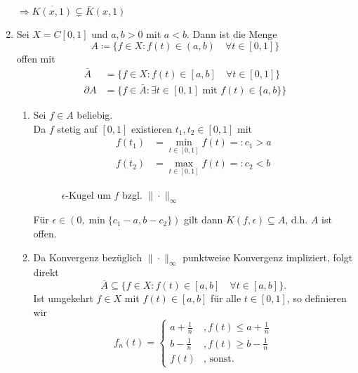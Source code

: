 \begin{beispiel}
\begin{enumerate}[label=\alph*\upshape)]
			$\Rightarrow \overline{K(x, 1)} \subsetneq \bar K(x, 1)$
		\item \label{bsp:4.11.b} Sei $X = C[0, 1]$ und $a, b > 0$ mit $a < b$. Dann ist die Menge
			\[ A \coloneqq \{ f \in X: f(t) \in (a, b) \quad \forall t \in [0, 1] \} \]
			offen mit
			\begin{align*}
				\bar A & = \{ f \in X: f(t) \in [a, b] \quad \forall t \in [0, 1] \} \\
				\partial A & = \{ f \in \bar A: \exists t \in [0, 1] \text{ mit } f(t) \in \{ a, b \} \}
			\end{align*}
			\begin{beweis}
				\begin{enumerate} 
 					\item Sei $f \in A$ beliebig. \\ 		
						Da $f$ stetig auf $[0, 1]$ existieren $t_{1}, t_{2} \in [0, 1]$ mit
						\begin{align*}
							f(t_{1}) & = \min_{t \in [0, 1]} f(t) =: c_{1} > a \\
							f(t_{2}) & = \max_{t \in [0, 1]} f(t) =: c_{2} < b
						\end{align*}
					
						\begin{figure}[H]
							\begin{center}		
								\caption{$\epsilon$-Kugel um $f$ bzgl. $\| \cdot \|_{\infty}$}
							\end{center}
						\end{figure}
															
						Für $\epsilon \in (0, \min\{c_1 - a, b - c_2\})$ gilt dann $K(f, \epsilon) \subseteq A$, d.h. $A$ ist offen.
					\item Da Konvergenz bezüglich $\| \cdot \|_{\infty}$ punktweise Konvergenz impliziert, folgt direkt
						\[ \overline{A} \subseteq \{ f\in X \colon f(t) \in [a, b] \quad \forall t \in [a,b] \}. \]
						Ist umgekehrt $f \in X$ mit $f(t) \in [a, b]$ für alle $t \in [0,1]$, so definieren wir
						\[ f_{n}(t) = \begin{cases} a + \frac{1}{n} &, f(t) \leq a + \frac{1}{n} \\ b - \frac{1}{n} &, f(t) \geq b - \frac{1}{n} \\ f(t) &, \text{ sonst.}  \end{cases}   \]
						

\end{enumerate}
\end{beweis}
\end{enumerate}
\end{beispiel}
